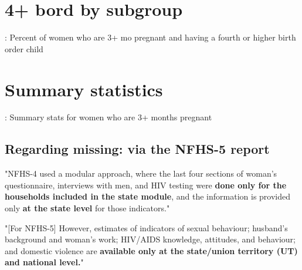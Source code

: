 \documentclass{article}
\begin{document}
\section{4+ bord by subgroup}

\begin{table}[H]
    \centering
    \setlength{\tabcolsep}{4pt} %
    \footnotesize %
    \caption{: Percent of women who are 3+ mo pregnant and having a fourth or higher birth order child}
    \label{tab:sumstat}
    \begin{adjustbox}{width=\textwidth}
        
    \end{adjustbox}
\end{table}






\section{Summary statistics}

\begin{table}[H]
    \centering
    \setlength{\tabcolsep}{4pt} %
    \footnotesize %
    \caption{: Summary stats for women who are 3+ months pregnant}
    \label{tab:sumstat}
    \begin{adjustbox}{width=\textwidth}
        
    \end{adjustbox}
\end{table}

\subsection{Regarding missing: via the NFHS-5 report}

"NFHS-4 used a modular approach, where the last four sections of woman’s questionnaire, interviews
with men, and HIV testing were \textbf{done only for the households included in the state module}, and the information is provided only \textbf{at the state level} for those indicators."

"[For NFHS-5] However, estimates of indicators of sexual behaviour; husband’s background and woman’s
work; HIV/AIDS knowledge, attitudes, and behaviour; and domestic violence are \textbf{available only at the state/union territory (UT) and national level.}"
\end{document}
